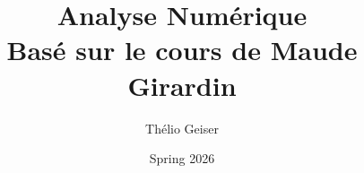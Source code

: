 \setlength{\parindent}{0pt}
\setlength{\parskip}{1em}

\usepackage[colorlinks=true, linkcolor=deffr, urlcolor=deffr, citecolor=deffr]{hyperref}

\title{\textbf{Analyse Numérique}\\ \large Basé sur le cours de Maude Girardin}
\author{Thélio Geiser}
\date{Spring 2026}